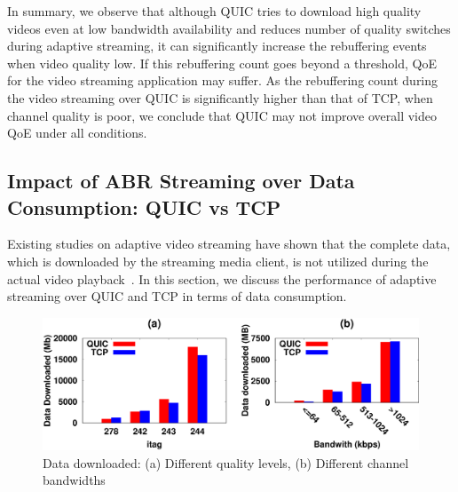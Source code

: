 In summary, we observe that although \ac{QUIC} tries to download high quality videos even at low bandwidth availability and reduces number of quality switches during adaptive streaming, it can significantly increase the rebuffering events when video quality low. 
If this rebuffering count goes beyond a threshold, \ac{QoE} for the video streaming application may suffer. 
As the rebuffering count during the video streaming over \ac{QUIC} is significantly higher than that of \ac{TCP}, when channel quality is poor, we conclude that \ac{QUIC} may not improve overall video \ac{QoE} under all conditions. 

%

\subsection{Impact of ABR Streaming over Data Consumption: QUIC vs TCP}

Existing studies on adaptive video streaming have shown that the complete data, which is downloaded by the streaming media client, is not utilized during the actual video playback~\cite{krishnappa2013dashing}. 
In this section, we discuss the performance of adaptive streaming over \ac{QUIC} and \ac{TCP} in terms of data consumption. 

\begin{figure}[!t]
	\captionsetup[subfigure]{}
	\begin{center}
        \includegraphics[width=0.9\linewidth]{img/plotdata/CDF/downloaded/data_dowloaded_itag_bw}
		\caption{\label{fig:data_download}Data downloaded: (a) Different quality levels, (b) Different channel bandwidths}
	\end{center}
\end{figure}


